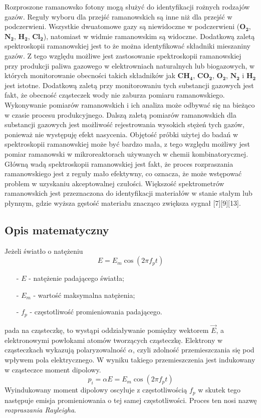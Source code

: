 Rozproszone ramanowsko fotony mogą służyć do identyfikacji rożnych rodzajów gazów. Reguły wyboru dla przejść ramanowskich są inne niż dla przejść w podczerwieni. Wszystkie dwuatomowe gazy są niewidoczne w podczerwieni ($\mathbf{O_{2}}$, $\mathbf{N_{2}}$, $\mathbf{H_{2}}$, $\mathbf{Cl_{2}}$), natomiast w widmie ramanowskim są widoczne. Dodatkową zaletą spektroskopii ramanowskiej jest to że można identyfikować składniki mieszaniny gazów. Z tego względu możliwe jest zastosowanie spektroskopii ramanowskiej przy produkcji paliwa gazowego w elektrowniach naturalnych lub biogazowych, w których monitorowanie obecności takich składników jak $\mathbf{CH_{4}}$, $\mathbf{CO_{2}}$, $\mathbf{O_{2}}$, $\mathbf{N_{2}}$ i $\mathbf{H_{2}}$ jest istotne. Dodatkową zaletą przy monitorowaniu tych substancji gazowych jest fakt, że obecność cząsteczek wody nie zaburza pomiaru ramanowskiego. Wykonywanie pomiarów ramanowskich i ich analiza może odbywać się na bieżąco w czasie procesu produkcyjnego. Dalszą zaletą pomiarów ramanowskich dla substancji gazowych jest możliwość rejestrowania wysokich stężeń tych gazów, ponieważ nie występuję efekt nasycenia. Objętość próbki użytej do badań w spektroskopii ramanowskiej może być bardzo mała, z tego względu możliwy jest pomiar ramanowski w mikroreaktorach używanych w chemii kombinatorycznej. Główną wadą spektroskopii ramanowskiej jest fakt, że proces rozpraszania ramanowskiego jest z reguły mało efektywny, co oznacza, że może wstępować problem w uzyskaniu akceptowalnej czułości. Większość spektrometrów ramanowskich jest przeznaczona do identyfikacji materiałów w stanie stałym lub płynnym, gdzie wyższa gęstość materiału znacząco zwiększa sygnał [7][9][13].

\subsection{Opis matematyczny}
Jeżeli światło o natężeniu 
\begin{equation}
	E = E_{m}\cos (2\pi f_{p}t)
\end{equation}
\begin{itemize}
	\item[-]{$E$ - natężenie padającego światła};
	\item[-]{$E_{m}$ - wartość maksymalna natężenia};
	\item[-]{$f_{p}$ - częstotliwość promieniowania padającego}.
\end{itemize}
pada na cząsteczkę, to wystąpi oddziaływanie pomiędzy wektorem $\overrightarrow{E}$, a elektronowymi powłokami atomów tworzących cząsteczkę.
Elektrony w cząsteczkach wykazują polaryzowalność $\alpha$, czyli zdolność przemieszczania
się pod wpływem pola elektrycznego. W wyniku takiego przemieszczenia jest indukowany w cząsteczce moment dipolowy.
\begin{equation}
	p_{i} = \alpha E = E_{m}\cos (2\pi f_{p}t)
\end{equation}
Wyindukowany moment dipolowy oscyluje z częstotliwością $f_{p}$ w skutek tego następuje emisja promieniowania o tej samej częstotliwości. Proces ten nosi nazwę \textit{rozpraszania Rayleigha}.

